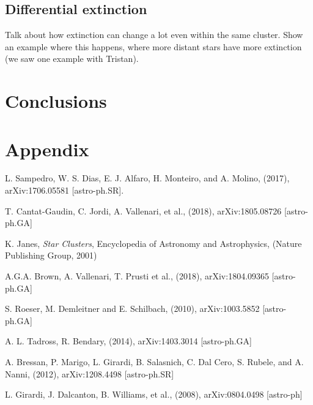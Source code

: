 \documentclass[twocolumn]{revtex4}
\begin{document}
\subsection{Differential extinction}
Talk about how extinction can change a lot even within the same cluster. Show an example where this happens, where more distant stars have more extinction (we saw one example with Tristan).

\section{Conclusions}


\section{Appendix}


\vspace*{0.5cm}
\begin{acknowledgments}

\end{acknowledgments}


\begin{thebibliography}{99}

 L. Sampedro, W. S. Dias, E. J. Alfaro, H. Monteiro, and A. Molino, (2017), arXiv:1706.05581 [astro-ph.SR].

 T. Cantat-Gaudin, C. Jordi, A. Vallenari, et al., (2018), arXiv:1805.08726 [astro-ph.GA]

 K. Janes, \textsl{Star Clusters}, Encyclopedia of Astronomy and Astrophysics, (Nature Publishing Group, 2001)

 A.G.A. Brown, A. Vallenari, T. Prusti et al., (2018), arXiv:1804.09365 [astro-ph.GA]

 S. Roeser, M. Demleitner and E. Schilbach, (2010), arXiv:1003.5852 [astro-ph.GA]

 A. L. Tadross, R. Bendary, (2014), arXiv:1403.3014 [astro-ph.GA]

 A. Bressan, P. Marigo, L. Girardi, B. Salasnich, C. Dal Cero, S. Rubele, and A. Nanni, (2012), arXiv:1208.4498 [astro-ph.SR]

 L. Girardi, J. Dalcanton, B. Williams, et al., (2008), arXiv:0804.0498 [astro-ph]


\end{thebibliography}
\end{document}
